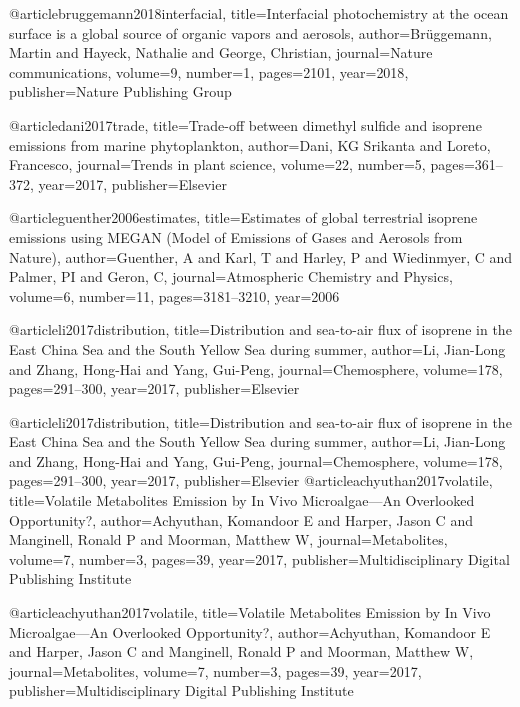@article{bruggemann2018interfacial,
  title={Interfacial photochemistry at the ocean surface is a global source of organic vapors and aerosols},
  author={Br{\"u}ggemann, Martin and Hayeck, Nathalie and George, Christian},
  journal={Nature communications},
  volume={9},
  number={1},
  pages={2101},
  year={2018},
  publisher={Nature Publishing Group}
}

@article{dani2017trade,
  title={Trade-off between dimethyl sulfide and isoprene emissions from marine phytoplankton},
  author={Dani, KG Srikanta and Loreto, Francesco},
  journal={Trends in plant science},
  volume={22},
  number={5},
  pages={361--372},
  year={2017},
  publisher={Elsevier}
}

@article{guenther2006estimates,
  title={Estimates of global terrestrial isoprene emissions using MEGAN (Model of Emissions of Gases and Aerosols from Nature)},
  author={Guenther, A and Karl, T and Harley, P and Wiedinmyer, C and Palmer, PI and Geron, C},
  journal={Atmospheric Chemistry and Physics},
  volume={6},
  number={11},
  pages={3181--3210},
  year={2006}
}

@article{li2017distribution,
  title={Distribution and sea-to-air flux of isoprene in the East China Sea and the South Yellow Sea during summer},
  author={Li, Jian-Long and Zhang, Hong-Hai and Yang, Gui-Peng},
  journal={Chemosphere},
  volume={178},
  pages={291--300},
  year={2017},
  publisher={Elsevier}
}

@article{li2017distribution,
  title={Distribution and sea-to-air flux of isoprene in the East China Sea and the South Yellow Sea during summer},
  author={Li, Jian-Long and Zhang, Hong-Hai and Yang, Gui-Peng},
  journal={Chemosphere},
  volume={178},
  pages={291--300},
  year={2017},
  publisher={Elsevier}
}
@article{achyuthan2017volatile,
  title={Volatile Metabolites Emission by In Vivo Microalgae—An Overlooked Opportunity?},
  author={Achyuthan, Komandoor E and Harper, Jason C and Manginell, Ronald P and Moorman, Matthew W},
  journal={Metabolites},
  volume={7},
  number={3},
  pages={39},
  year={2017},
  publisher={Multidisciplinary Digital Publishing Institute}
}

@article{achyuthan2017volatile,
  title={Volatile Metabolites Emission by In Vivo Microalgae—An Overlooked Opportunity?},
  author={Achyuthan, Komandoor E and Harper, Jason C and Manginell, Ronald P and Moorman, Matthew W},
  journal={Metabolites},
  volume={7},
  number={3},
  pages={39},
  year={2017},
  publisher={Multidisciplinary Digital Publishing Institute}
}


